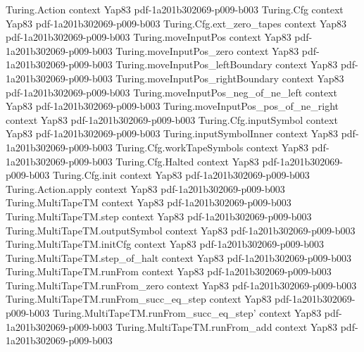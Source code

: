 \begin{theorem}
\label{Complexity.PH_eq_SigmaP_of_SigmaP_eq_PiP}
\leanok
\proofstep
  {Turing.Action}
  {context}
  {Yap83}
  {pdf-1a201b302069-p009-b003}
\proofstep
  {Turing.Cfg}
  {context}
  {Yap83}
  {pdf-1a201b302069-p009-b003}
\proofstep
  {Turing.Cfg.ext_zero_tapes}
  {context}
  {Yap83}
  {pdf-1a201b302069-p009-b003}
\proofstep
  {Turing.moveInputPos}
  {context}
  {Yap83}
  {pdf-1a201b302069-p009-b003}
\proofstep
  {Turing.moveInputPos_zero}
  {context}
  {Yap83}
  {pdf-1a201b302069-p009-b003}
\proofstep
  {Turing.moveInputPos_leftBoundary}
  {context}
  {Yap83}
  {pdf-1a201b302069-p009-b003}
\proofstep
  {Turing.moveInputPos_rightBoundary}
  {context}
  {Yap83}
  {pdf-1a201b302069-p009-b003}
\proofstep
  {Turing.moveInputPos_neg_of_ne_left}
  {context}
  {Yap83}
  {pdf-1a201b302069-p009-b003}
\proofstep
  {Turing.moveInputPos_pos_of_ne_right}
  {context}
  {Yap83}
  {pdf-1a201b302069-p009-b003}
\proofstep
  {Turing.Cfg.inputSymbol}
  {context}
  {Yap83}
  {pdf-1a201b302069-p009-b003}
\proofstep
  {Turing.inputSymbolInner}
  {context}
  {Yap83}
  {pdf-1a201b302069-p009-b003}
\proofstep
  {Turing.Cfg.workTapeSymbols}
  {context}
  {Yap83}
  {pdf-1a201b302069-p009-b003}
\proofstep
  {Turing.Cfg.Halted}
  {context}
  {Yap83}
  {pdf-1a201b302069-p009-b003}
\proofstep
  {Turing.Cfg.init}
  {context}
  {Yap83}
  {pdf-1a201b302069-p009-b003}
\proofstep
  {Turing.Action.apply}
  {context}
  {Yap83}
  {pdf-1a201b302069-p009-b003}
\proofstep
  {Turing.MultiTapeTM}
  {context}
  {Yap83}
  {pdf-1a201b302069-p009-b003}
\proofstep
  {Turing.MultiTapeTM.step}
  {context}
  {Yap83}
  {pdf-1a201b302069-p009-b003}
\proofstep
  {Turing.MultiTapeTM.outputSymbol}
  {context}
  {Yap83}
  {pdf-1a201b302069-p009-b003}
\proofstep
  {Turing.MultiTapeTM.initCfg}
  {context}
  {Yap83}
  {pdf-1a201b302069-p009-b003}
\proofstep
  {Turing.MultiTapeTM.step_of_halt}
  {context}
  {Yap83}
  {pdf-1a201b302069-p009-b003}
\proofstep
  {Turing.MultiTapeTM.runFrom}
  {context}
  {Yap83}
  {pdf-1a201b302069-p009-b003}
\proofstep
  {Turing.MultiTapeTM.runFrom_zero}
  {context}
  {Yap83}
  {pdf-1a201b302069-p009-b003}
\proofstep
  {Turing.MultiTapeTM.runFrom_succ_eq_step}
  {context}
  {Yap83}
  {pdf-1a201b302069-p009-b003}
\proofstep
  {Turing.MultiTapeTM.runFrom_succ_eq_step'}
  {context}
  {Yap83}
  {pdf-1a201b302069-p009-b003}
\proofstep
  {Turing.MultiTapeTM.runFrom_add}
  {context}
  {Yap83}
  {pdf-1a201b302069-p009-b003}

\end{theorem}
